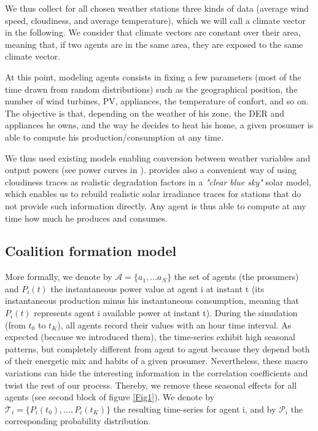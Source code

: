 \documentclass[conference]{IEEEtran}
\begin{document}
We thus collect for all chosen weather stations three kinds of data (average wind speed, cloudiness, and average temperature), which we will call a climate vector in the following. We consider that climate vectors are constant over their area, meaning that, if two agents are in the same area, they are exposed to the same climate vector.

At this point, modeling agents consists in fixing a few parameters (most of the time drawn from random distributions) such as the geographical position, the number of wind turbines, PV, appliances, the temperature of confort, and so on. The objective is that, depending on the weather of his zone, the DER and appliances he owns, and the way he decides to heat his home, a given prosumer is able to compute his production/consumption at any time. 

We thus used existing models enabling conversion between weather variables and output powers (see power curves in \cite{Kota2011} \cite{windturbinemodel}). \cite{Dans2007} provides also a convenient way of using cloudiness traces as realistic degradation factors in a \textit{"clear blue sky"} solar model, which enables us to rebuild realistic solar irradiance traces for stations that do not provide such information directly. Any agent is thus able to compute at any time how much he produces and consumes. 

\subsection{Coalition formation model}\label{subsec:Coalition}
More formally, we denote by $ \mathcal{A} = \{ a_{1},...a_{N} \} $ the set of agents (the prosumers) and $ P_{i}(t) $ the instantaneous power value at agent i at instant t (its instantaneous production minus his instantaneous consumption, meaning that $ P_{i}(t) $ represents agent i available power at instant t). During the simulation (from $t_{0} $ to $ t_{K} $), all agents record their values with an hour time interval. As expected (because we introduced them), the time-series exhibit high seasonal patterns, but completely different from agent to agent because they depend both of their energetic mix and habits of a given prosumer. Nevertheless, these macro variations can hide the interesting information in the correlation coefficients and twist the rest of our process. Thereby, we remove these seasonal effects for all agents (see second block of figure \ref{Fig1}). We denote by $ \mathcal{T}_{i} = \{ P_{i}(t_{0}),...,P_{i}(t_{K}) \} $ the resulting time-series for  agent i, and by $ \mathcal{P}_{i} $ the corresponding probability distribution.
\end{document}
